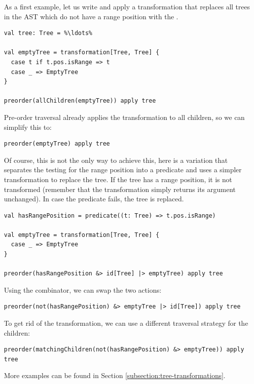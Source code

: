 As a first example, let us write and apply a transformation that replaces all trees in the AST which do not have a range position with the .

\begin{lstlisting}
val tree: Tree = %\ldots%

val emptyTree = transformation[Tree, Tree] {
  case t if t.pos.isRange => t
  case _ => EmptyTree
}

preorder(allChildren(emptyTree)) apply tree
\end{lstlisting}

Pre-order traversal already applies the transformation to all children, so we can simplify this to:

\begin{lstlisting}
preorder(emptyTree) apply tree
\end{lstlisting}

Of course, this is not the only way to achieve this, here is a variation that separates the testing for the range position into a predicate and uses a simpler transformation to replace the tree. If the tree has a range position, it is not transformed (remember that the  transformation simply returns its argument unchanged). In case the predicate fails, the tree is replaced.

\begin{lstlisting}
val hasRangePosition = predicate((t: Tree) => t.pos.isRange)

val emptyTree = transformation[Tree, Tree] {
  case _ => EmptyTree
}

preorder(hasRangePosition &> id[Tree] |> emptyTree) apply tree
\end{lstlisting}

Using the  combinator, we can swap the two actions:

\begin{lstlisting}
preorder(not(hasRangePosition) &> emptyTree |> id[Tree]) apply tree
\end{lstlisting}

To get rid of the  transformation, we can use a different traversal strategy for the children:

\begin{lstlisting}
preorder(matchingChildren(not(hasRangePosition) &> emptyTree)) apply tree
\end{lstlisting}

More examples can be found in Section \vref{subsection:tree-transformations}.

